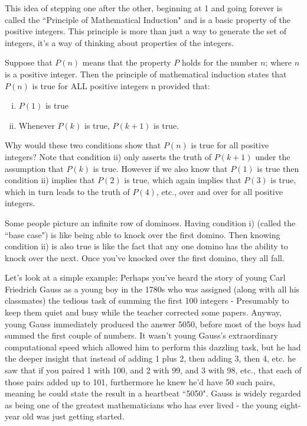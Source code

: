 \documentclass{article}
\begin{document}
This idea of stepping one after the other,
beginning at 1 and going forever is called the ``Principle of Mathematical
Induction" and is a basic property of the positive integers.
This principle is more than just a way to generate the set of integers,
it's a way of thinking about properties of the integers.

Suppose that $P(n)$ means that the property $P$ holds
for the number $n$; where $n$ is a positive integer.
Then the principle of mathematical induction states that $P(n)$
is true for ALL positive integers n provided that:

\begin{enumerate}[i)]
\item $P(1)$ is true
\item Whenever $P(k)$ is true, $P(k+1)$ is true.
\end{enumerate}

Why would these two conditions show that $P(n)$ is true for all
positive integers? Note that condition ii) only asserts the truth
of $P(k+1)$ under the assumption that $P(k)$ is true.
However if we also know that $P(1)$ is true then condition ii) implies that $P(2)$ is true,
which again implies that $P(3)$ is true,
which in turn leads to the truth of $P(4)$,
etc., over and over for all positive integers.

Some people picture an infinite row of dominoes.
Having condition i) (called the ``base case") is like being
able to knock over the first domino.
Then knowing condition ii) is also true is like the
fact that any one domino has the ability to knock over the next.
Once you've knocked over the first domino,
they all fall.

Let's look at a simple example:
Perhaps you've heard the story of young Carl Friedrich Gauss
as a young boy in
the 1780s who was assigned (along with all his classmates)
the tedious task of summing the first 100 integers -
Presumably to keep them quiet and busy while the
teacher corrected some papers.  Anyway,
young Gauss immediately produced the answer
5050, before most of the boys had summed the first couple of numbers.
It wasn't young Gauss's extraordinary computational speed which allowed
him to perform this dazzling task,
but he had the deeper insight that instead of adding 1 plus 2,
then adding 3, then 4, etc.
he saw that if you paired 1 with 100,
and 2 with 99,
and 3 with 98,
etc.,
that each of those pairs added up to 101,
furthermore he knew he'd have 50 such pairs,
meaning he could state the result in a heartbeat ``5050".
Gauss is widely regarded as being one of the greatest
mathematicians who has ever lived - the young eight-year old was just getting started.
\end{document}
